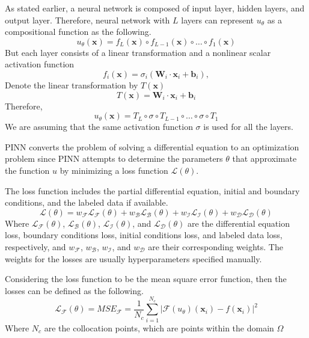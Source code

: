 \documentclass[a4paper,12pt]{article}
\theoremstyle{definition}
\begin{document}
As stated earlier, a neural network is composed of input layer, 
hidden layers, and output layer. Therefore, neural network with $L$
layers can represent $u_\theta$ as a compositional function as the following.
$$
u_{\theta}(\mathbf{x}) = f_L(\mathbf{x}) \circ f_{L-1}(\mathbf{x}) \circ \dots \circ f_1(\mathbf{x})
$$
But each layer consists of a linear transformation and a nonlinear scalar activation function
$$
f_i(\mathbf{x}) = \sigma_i \left( \mathbf{W}_i \cdot \mathbf{x}_i + \mathbf{b}_i \right), 
$$
Denote the linear transformation by $T(\mathbf{x})$
$$
T(\mathbf{x}) = \mathbf{W}_i \cdot \mathbf{x}_i + \mathbf{b}_i 
$$
Therefore, 
\begin{equation}
u_{\theta}(\mathbf{x}) = T_L \circ \sigma \circ T_{L-1} \circ \dots \circ \sigma \circ T_1
\end{equation}
We are assuming that the same activation function $\sigma$ is used for all the layers.

PINN converts the problem of solving a differential equation 
to an optimization problem since PINN attempts to determine the parameters $\theta$ 
that approximate the function $u$ by minimizing a loss function $\mathcal{L}(\theta)$\cite{cuomo2022scientific}.

The loss function includes the partial differential equation, initial and boundary conditions, and 
the labeled data if available.
\begin{equation}
\mathcal{L}(\theta) = w_{\mathcal{F}} \mathcal{L}_{\mathcal{F}}(\theta)
+ w_{\mathcal{B}} \mathcal{L}_{\mathcal{B}}(\theta) 
+ w_{\mathcal{I}} \mathcal{L}_{\mathcal{I}}(\theta)
+ w_{\mathcal{D}} \mathcal{L}_{\mathcal{D}}(\theta)
\end{equation}
Where $\mathcal{L}_{\mathcal{F}}(\theta)$, $\mathcal{L}_{\mathcal{B}}(\theta)$, 
$\mathcal{L}_{\mathcal{I}}(\theta)$, and $\mathcal{L}_{\mathcal{D}}(\theta)$ are the differential equation loss,
boundary conditions loss, initial conditions loss, and labeled data loss, respectively, and $w_{\mathcal{F}}$, 
$w_{\mathcal{B}}$, $w_{\mathcal{I}}$, and $w_{\mathcal{D}}$ are their corresponding weights. 
The weights for the losses are usually hyperparameters specified manually.

Considering the loss function to be the mean square error function, then the losses can be 
defined as the following.
\begin{equation}\label{pde loss}
\mathcal{L}_{\mathcal{F}}(\theta) = MSE_{\mathcal{F}} 
= \frac{1}{N_c} \sum_{i=1}^{N_c} \bigg| \mathcal{F}(u_\theta)(\mathbf{x}_i) - f(\mathbf{x}_i) \bigg|^2
\end{equation}
Where $N_c$ are the collocation points, which are points within the domain $\Omega$
\end{document}
